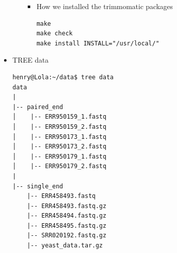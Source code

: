 \documentclass{article}
\begin{document}
\begin{itemize}
\begin{enumerate}
\begin{itemize}
\begin{verbatim}
\end{verbatim}
\normalsize
\item How we installed the trimmomatic packages
\scriptsize  
\begin{verbatim}
make
make check
make install INSTALL="/usr/local/"
\end{verbatim}
\normalsize
\end{itemize}
\end{enumerate}
\item TREE data
\tiny
\begin{verbatim}
henry@Lola:~/data$ tree data
data
|
|-- paired_end
│    |-- ERR950159_1.fastq
│    |-- ERR950159_2.fastq
│    |-- ERR950173_1.fastq
│    |-- ERR950173_2.fastq
│    |-- ERR950179_1.fastq
│    |-- ERR950179_2.fastq
|
|-- single_end
    |-- ERR458493.fastq
    |-- ERR458493.fastq.gz
    |-- ERR458494.fastq.gz
    |-- ERR458495.fastq.gz
    |-- SRR020192.fastq.gz
    |-- yeast_data.tar.gz
\end{verbatim}
\normalsize
\end{itemize}
\end{document}
